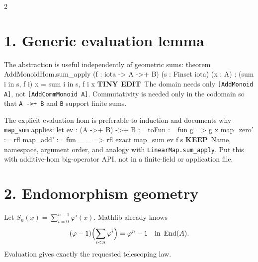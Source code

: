 \documentclass[9pt]{article}
\newenvironment{lean}{\Verbatim[fontsize=\scriptsize,frame=single,framesep=1.2mm,formatcom=\leanfont]}{\endVerbatim}
\newcommand{\good}{\textcolor{keep}{\bfseries KEEP}}
\newcommand{\edit}{\textcolor{change}{\bfseries TINY EDIT}}
\begin{document}
\begin{multicols}{2}
\section*{1. Generic evaluation lemma}
The abstraction is useful independently of geometric sums:
\begin{lean}
theorem AddMonoidHom.sum_apply
    (f : iota -> A ->+ B) (s : Finset iota) (x : A) :
    (sum i in s, f i) x = sum i in s, f i x
\end{lean}
\edit\ The domain needs only \texttt{[AddMonoid A]}, not
\texttt{[AddCommMonoid A]}.  Commutativity is needed only in the codomain so
that \texttt{A ->+ B} and \texttt{B} support finite sums.

The explicit evaluation hom is preferable to induction and documents why
\texttt{map\_sum} applies:
\begin{lean}
let ev : (A ->+ B) ->+ B :=
  { toFun := fun g => g x
    map_zero' := rfl
    map_add' := fun _ _ => rfl }
exact map_sum ev f s
\end{lean}
\good\ Name, namespace, argument order, and analogy with
\texttt{LinearMap.sum\_apply}.  Put this with additive-hom big-operator API,
not in a finite-field or application file.

\section*{2. Endomorphism geometry}
Let $S_n(x)=\sum_{i=0}^{n-1}\varphi^i(x)$.  Mathlib already knows
\[
 (\varphi-1)\Bigl(\sum_{i<n}\varphi^i\Bigr)=\varphi^n-1
 \quad\text{in }\operatorname{End}(A).
\]
Evaluation gives exactly the requested telescoping law.

\columnbreak
\begin{center}
\end{center}


\end{multicols}
\end{document}
